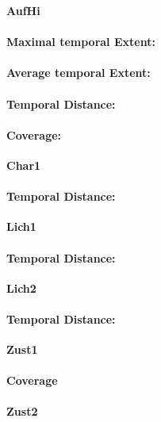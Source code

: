 \Large
\centerline{\textbf{AufHi}}
\normalsize

\paragraph{Maximal temporal Extent:}
\paragraph{Average temporal Extent:}
\paragraph{Temporal Distance:}
\paragraph{Coverage:}

\Large
\centerline{\textbf{Char1}}
\normalsize

\paragraph{Temporal Distance:}

\Large
\centerline{\textbf{Lich1}}
\normalsize

\paragraph{Temporal Distance:}

\Large
\centerline{\textbf{Lich2}}
\normalsize

\paragraph{Temporal Distance:}

\Large
\centerline{\textbf{Zust1}}
\normalsize

\paragraph{Coverage}

\Large
\centerline{\textbf{Zust2}}
\normalsize

